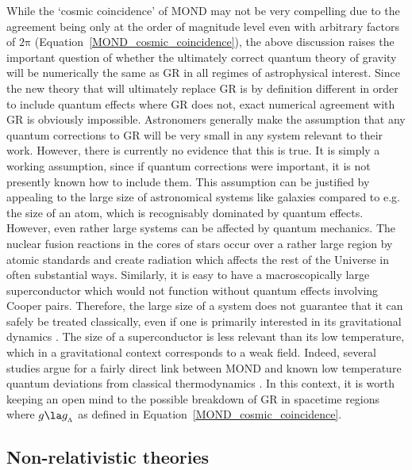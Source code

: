 \documentclass[fleqn,usenatbib,useAMS,onecolumn]{mnras} %
\begin{document}
While the `cosmic coincidence' of MOND may not be very compelling due to the agreement being only at the order of magnitude level even with arbitrary factors of $2\mathrm{\pi}$ (Equation~\ref{MOND_cosmic_coincidence}), the above discussion raises the important question of whether the ultimately correct quantum theory of gravity will be numerically the same as GR in all regimes of astrophysical interest. Since the new theory that will ultimately replace GR is by definition different in order to include quantum effects where GR does not, exact numerical agreement with GR is obviously impossible. Astronomers generally make the assumption that any quantum corrections to GR will be very small in any system relevant to their work. However, there is currently no evidence that this is true. It is simply a working assumption, since if quantum corrections were important, it is not presently known how to include them. This assumption can be justified by appealing to the large size of astronomical systems like galaxies compared to e.g. the size of an atom, which is recognisably dominated by quantum effects. However, even rather large systems can be affected by quantum mechanics. The nuclear fusion reactions in the cores of stars occur over a rather large region by atomic standards and create radiation which affects the rest of the Universe in often substantial ways. Similarly, it is easy to have a macroscopically large superconductor which would not function without quantum effects involving Cooper pairs. Therefore, the large size of a system does not guarantee that it can safely be treated classically, even if one is primarily interested in its gravitational dynamics \citep{Cadoni_2019, Giusti_2022}. The size of a superconductor is less relevant than its low temperature, which in a gravitational context corresponds to a weak field. Indeed, several studies argue for a fairly direct link between MOND and known low temperature quantum deviations from classical thermodynamics \citep*{Pazy_2013, Bagchi_2019, Senay_2021}. In this context, it is worth keeping an open mind to the possible breakdown of GR in spacetime regions where $g \la g_{_\Lambda}$ as defined in Equation~\ref{MOND_cosmic_coincidence}.



\subsection{Non-relativistic theories}
\label{Non_relativistic_MOND}
\end{document}
